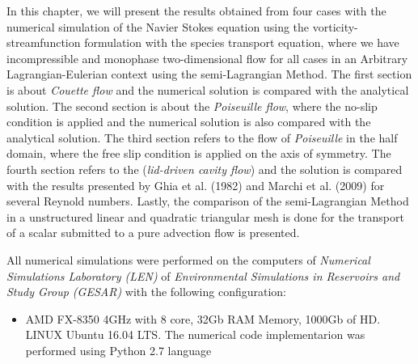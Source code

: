 In this chapter, we will present the results obtained from 
four cases with the numerical simulation of the Navier Stokes 
equation using the vorticity-streamfunction formulation with 
the species transport equation, where we have incompressible 
and monophase two-dimensional flow for all cases
in an Arbitrary Lagrangian-Eulerian context
using the semi-Lagrangian Method. 
The first section is about \textit{Couette flow} and 
the numerical solution is compared with the analytical solution. 
The second section is about the \textit{Poiseuille flow},
where the no-slip condition is applied 
and the numerical solution is also compared with 
the analytical solution. The third section refers to the flow 
of \textit {Poiseuille} in the half domain, where the 
free slip condition is applied on the axis of symmetry. 
The fourth section refers to the (\textit{lid-driven cavity flow}) 
and the solution is compared with the results presented 
by Ghia et al. (1982) \cite{ghia1982} and 
Marchi et al. (2009) \cite{marchi2009} for several Reynold numbers. 
Lastly, the comparison of the semi-Lagrangian Method in a unstructured
linear and quadratic triangular mesh is done
for the transport of a scalar 
submitted to a pure advection flow is presented.

\medskip
All numerical simulations were performed on the computers 
of \textit {Numerical Simulations Laboratory (LEN)} 
of \textit {Environmental Simulations in Reservoirs and 
Study Group (GESAR)} with the following configuration:

\begin{itemize}
 \item AMD FX-8350 4GHz with 8 core, 32Gb RAM Memory, 1000Gb of HD.
       LINUX Ubuntu 16.04 LTS. The numerical code implementarion was
       performed using Python 2.7 language
\end{itemize}

\newpage
